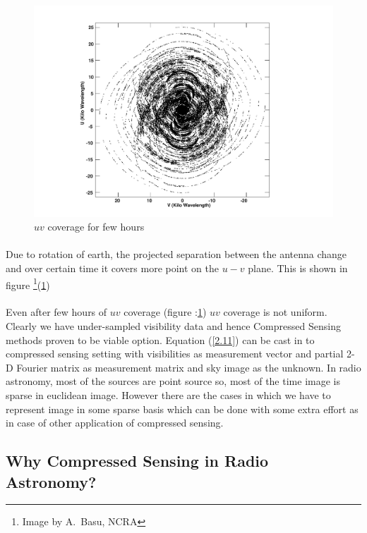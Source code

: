\begin{figure}[!htbp]
 \hspace*{-10em}
 \includegraphics[width=1.5\textwidth]{figures/fewhrs}
 \caption{$uv$ coverage for few hours}
 \label{Figfewhrs}
\end{figure}
\newpage
\paragraph{}Due to rotation of earth, the projected separation between the antenna change and over certain time
it covers more point on the $u-v$ plane. This is shown in figure \footnote{Image by A.\ Basu, NCRA}(\ref{Figfewhrs})

\paragraph{}Even after few hours of $uv$ coverage (figure :\ref{Figfewhrs}) $uv$ coverage is not uniform.
Clearly we have under-sampled visibility data and hence Compressed Sensing methods proven to be viable option. Equation (\ref{2.11})
can be cast in to compressed sensing setting with visibilities as measurement vector and partial 2-D Fourier matrix as
measurement matrix and sky image as the unknown. In radio astronomy, most of the sources are point source so, most of the time
image is sparse in euclidean image. However there are the cases in which we have to represent image in some sparse basis which
can be done with some extra effort as in case of other application of compressed sensing.

\subsection{Why Compressed Sensing in Radio Astronomy?}
\label{s:radio_cs_why}
